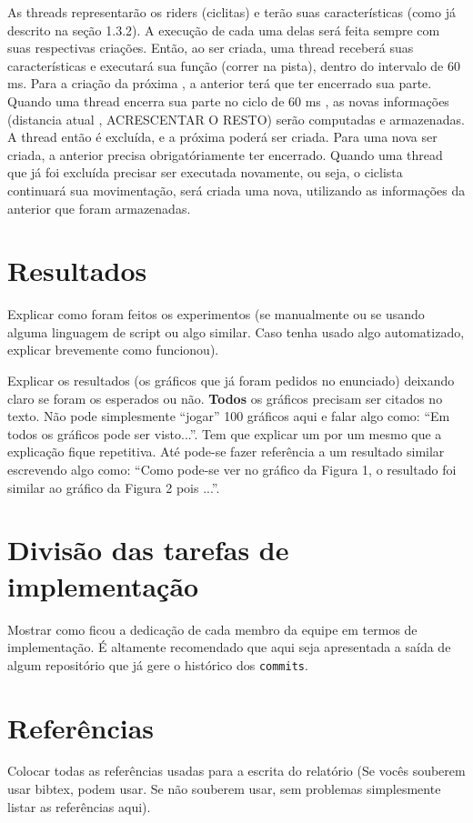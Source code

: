 \documentclass[12pt,a4paper]{article}
\begin{document}
	As threads representarão os riders (ciclitas) e terão suas características (como já descrito na seção 1.3.2). A execução de cada uma delas será feita sempre com suas respectivas criações. Então, ao ser criada, uma thread receberá suas características e executará sua função (correr na pista), dentro do intervalo de 60 ms. Para a criação da próxima , a anterior terá que ter encerrado sua parte. Quando uma thread encerra sua parte no ciclo de 60 ms , as novas informações (distancia atual , ACRESCENTAR O RESTO) serão computadas e armazenadas. A thread então é excluída, e a próxima poderá ser criada. Para uma nova ser criada, a anterior precisa obrigatóriamente ter encerrado. Quando uma thread que já foi excluída precisar ser executada novamente, ou seja, o ciclista continuará sua movimentação, será criada uma nova, utilizando as informações da anterior que foram armazenadas.

\section{Resultados}

Explicar como foram feitos os experimentos (se manualmente ou se
usando alguma linguagem de script ou algo similar. Caso tenha usado
algo automatizado, explicar brevemente como funcionou).

Explicar os resultados (os gráficos que já foram pedidos no
enunciado) deixando claro se foram os esperados ou não. \textbf{Todos}
os gráficos precisam ser citados no texto. Não pode simplesmente
``jogar'' 100 gráficos aqui e falar algo como: ``Em todos os gráficos
pode ser visto...''. Tem que explicar um por um mesmo que a explicação
fique repetitiva. Até pode-se fazer referência a um resultado similar
escrevendo algo como: ``Como pode-se ver no gráfico da Figura 1, o
resultado foi similar ao gráfico da Figura 2 pois ...''.

\section{Divisão das tarefas de implementação}

Mostrar como ficou a dedicação de cada membro da equipe em termos de
implementação. É altamente recomendado que aqui seja apresentada a
saída de algum repositório que já gere o histórico dos
\texttt{commits}.

\section{Referências}

Colocar todas as referências usadas para a escrita do relatório (Se
vocês souberem usar bibtex, podem usar. Se não souberem usar, sem
problemas simplesmente listar as referências aqui).
\end{document}

